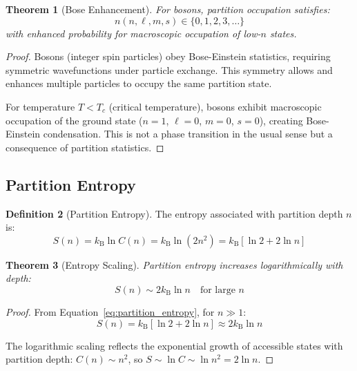 \documentclass[11pt,twocolumn,a4paper]{article}
\newtheorem{theorem}{Theorem}[section]
\theoremstyle{definition}
\newtheorem{definition}[theorem]{Definition}
\theoremstyle{remark}
\newcommand{\kB}{k_{\mathrm{B}}}
\begin{document}
\begin{theorem}[Bose Enhancement]
\label{thm:bose_enhancement}
For bosons, partition occupation satisfies:
\begin{equation}
n(n,\ell,m,s) \in \{0,1,2,3,\ldots\}
\label{eq:bose_occupation}
\end{equation}
with enhanced probability for macroscopic occupation of low-$n$ states.
\end{theorem}

\begin{proof}
Bosons (integer spin particles) obey Bose-Einstein statistics, requiring symmetric wavefunctions under particle exchange. This symmetry allows and enhances multiple particles to occupy the same partition state.

For temperature $T < T_c$ (critical temperature), bosons exhibit macroscopic occupation of the ground state ($n=1$, $\ell=0$, $m=0$, $s=0$), creating Bose-Einstein condensation. This is not a phase transition in the usual sense but a consequence of partition statistics.
\end{proof}

\subsection{Partition Entropy}

\begin{definition}[Partition Entropy]
\label{def:partition_entropy}
The entropy associated with partition depth $n$ is:
\begin{equation}
S(n) = \kB \ln C(n) = \kB \ln(2n^2) = \kB[\ln 2 + 2\ln n]
\label{eq:partition_entropy}
\end{equation}
\end{definition}

\begin{theorem}[Entropy Scaling]
\label{thm:entropy_scaling}
Partition entropy increases logarithmically with depth:
\begin{equation}
S(n) \sim 2\kB \ln n \quad \text{for large } n
\label{eq:entropy_scaling}
\end{equation}
\end{theorem}

\begin{proof}
From Equation~\eqref{eq:partition_entropy}, for $n \gg 1$:
\begin{equation}
S(n) = \kB[\ln 2 + 2\ln n] \approx 2\kB \ln n
\end{equation}

The logarithmic scaling reflects the exponential growth of accessible states with partition depth: $C(n) \sim n^2$, so $S \sim \ln C \sim \ln n^2 = 2\ln n$.
\end{proof}
\end{document}
